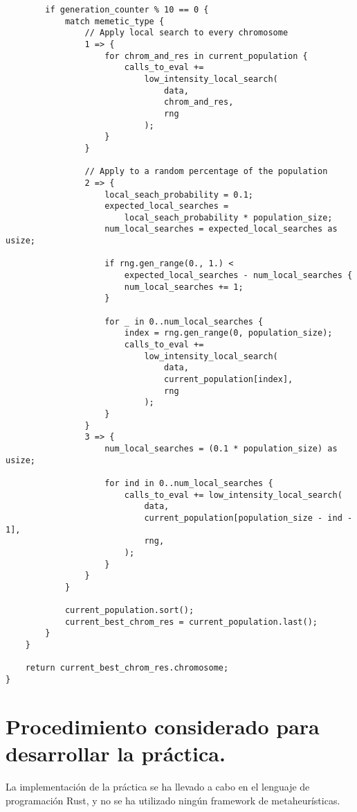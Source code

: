 \documentclass[size=a4, parskip=half, titlepage=false, toc=flat, toc=bib, 12pt]{scrartcl}
\begin{document}
\begin{verbatim}
        if generation_counter % 10 == 0 {
            match memetic_type {
                // Apply local search to every chromosome
                1 => {
                    for chrom_and_res in current_population {
                        calls_to_eval +=
                            low_intensity_local_search(
                                data,
                                chrom_and_res,
                                rng
                            );
                    }
                }

                // Apply to a random percentage of the population
                2 => {
                    local_seach_probability = 0.1;
                    expected_local_searches =
                        local_seach_probability * population_size;
                    num_local_searches = expected_local_searches as usize;

                    if rng.gen_range(0., 1.) <
                        expected_local_searches - num_local_searches {
                        num_local_searches += 1;
                    }

                    for _ in 0..num_local_searches {
                        index = rng.gen_range(0, population_size);
                        calls_to_eval +=
                            low_intensity_local_search(
                                data,
                                current_population[index],
                                rng
                            );
                    }
                }
                3 => {
                    num_local_searches = (0.1 * population_size) as usize;

                    for ind in 0..num_local_searches {
                        calls_to_eval += low_intensity_local_search(
                            data,
                            current_population[population_size - ind - 1],
                            rng,
                        );
                    }
                }
            }

            current_population.sort();
            current_best_chrom_res = current_population.last();
        }
    }

    return current_best_chrom_res.chromosome;
}
\end{verbatim}

\newpage
\section{Procedimiento considerado para desarrollar la práctica.}
La implementación de la práctica se ha llevado a cabo en el lenguaje de programación Rust, y no se ha utilizado ningún framework de metaheurísticas.\\
\end{document}
